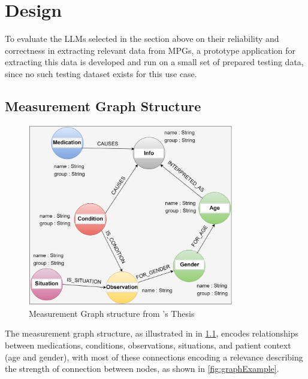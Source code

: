 \documentclass[bs, english]{stthesis}
\edef\picturewidth{0.8\textwidth}
\begin{document}
\chapter{Design}
\label{ch:Design}

To evaluate the LLMs selected in the section above on their reliability and correctness in extracting relevant data from MPGs, a prototype application for extracting this data is developed and run on a small set of prepared testing data, since no such testing dataset exists for this use case.

\section{Measurement Graph Structure}

\begin{figure}[h]
  \centering
  \includegraphics[width=\picturewidth]{measurement_graph_structure.png}
  \caption{Measurement Graph structure from \citeauthor{TOM}'s Thesis\\ \cite[subsection 4.4.1]{TOM}}
  \label{fig:graphStructure}
\end{figure}

The measurement graph structure, as illustrated in in \cref{fig:graphStructure}, encodes relationships between medications, conditions, observations, situations, and patient context (age and gender), with most of these connections encoding a relevance describing the strength of connection between nodes, as shown in \cref{fig:graphExample}.
\end{document}
